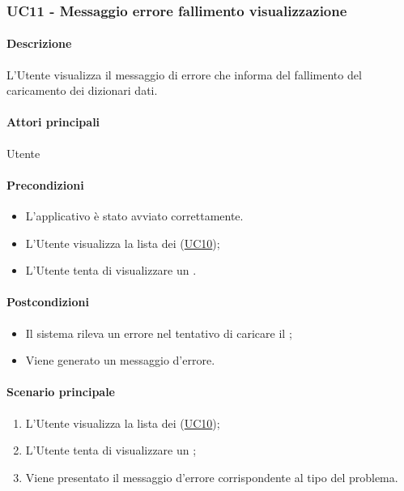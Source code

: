 \subsubsection{UC11 - Messaggio errore fallimento visualizzazione }\label{UC11}
\paragraph*{Descrizione}
L’Utente visualizza il messaggio di errore che informa del fallimento del caricamento dei dizionari dati.

\paragraph*{Attori principali}
Utente

\paragraph*{Precondizioni}
\begin{itemize}
  \item L'applicativo è stato avviato correttamente.
  \item L'Utente visualizza la lista dei  (\hyperref[UC10]{UC10});
  \item L'Utente tenta di visualizzare un .
\end{itemize}

\paragraph*{Postcondizioni}
\begin{itemize}
  \item Il sistema rileva un errore nel tentativo di caricare il ;
  \item Viene generato un messaggio d'errore.
\end{itemize}

\paragraph*{Scenario principale}
\begin{enumerate}
  \item L’Utente visualizza la lista dei  (\hyperref[UC10]{UC10});
  \item L'Utente tenta di visualizzare un ;
  \item Viene presentato il messaggio d’errore corrispondente al tipo del problema.  
\end{enumerate}
